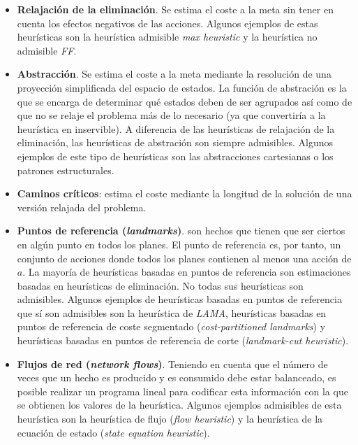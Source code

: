 \documentclass{article}
\begin{document}
    \begin{itemize}
        \item \textbf{Relajación de la eliminación}. Se estima el coste a la meta sin tener en cuenta los efectos negativos de las acciones. Algunos ejemplos de estas heurísticas son la heurística admisible \textit{max heuristic} y la heurística no admisible \textit{FF}\cite{FF}.
        \item \textbf{Abstracción}. Se estima el coste a la meta mediante la resolución de una proyección simplificada del espacio de estados. La función de abstración es la que se encarga de determinar qué estados deben de ser agrupados así como de que no se relaje el problema más de lo necesario (ya que convertiría a la heurística en inservible). A diferencia de las heurísticas de relajación de la eliminación, las heurísticas de abstración son siempre admisibles. Algunos ejemplos de este tipo de heurísticas son las abstracciones cartesianas o los patrones estructurales.
        \item \textbf{Caminos críticos}: estima el coste mediante la longitud de la solución de una versión relajada del problema.
        \item \textbf{Puntos de referencia (\textit{landmarks})}. son hechos que tienen que ser ciertos en algún punto en todos los planes. El punto de referencia es, por tanto, un conjunto de acciones donde todos los planes contienen al menos una acción de $a$. La mayoría de heurísticas basadas en puntos de referencia son estimaciones basadas en heurísticas de eliminación. No todas sus heurísticas son admisibles. Algunos ejemplos de heurísticas basadas en puntos de referencia que sí son admisibles son la heurística de \textit{LAMA}, heurísticas basadas en puntos de referencia de coste segmentado (\textit{cost-partitioned landmarks}) y heurísticas basadas en puntos de referencia de corte (\textit{landmark-cut heuristic}).
        \item \textbf{Flujos de red (\textit{network flows})}. Teniendo en cuenta que el número de veces que un hecho es producido y es consumido debe estar balanceado, es posible realizar un programa lineal para codificar esta información con la que se obtienen los valores de la heurística. Algunos ejemplos admisibles de esta heurística son la heurística de flujo (\textit{flow heuristic}) y la heurística de la ecuación de estado (\textit{state equation heuristic}).
    
    \end{itemize}
    
\end{document}
